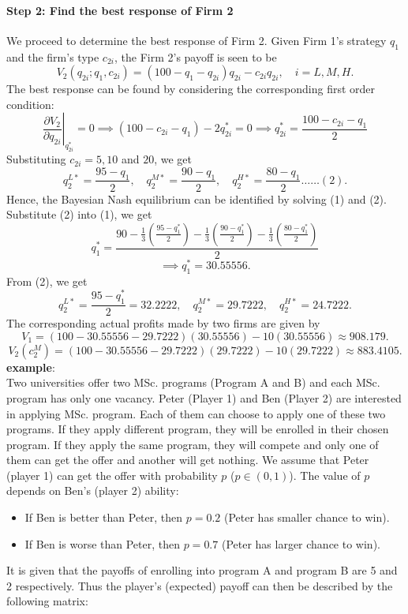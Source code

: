\documentclass[twoside]{article}
\theoremstyle{definitionstyle}
\begin{document}
\paragraph{Step 2: Find the best response of Firm 2}
We proceed to determine the best response of Firm 2. Given Firm 1's strategy $q_1$ and the firm's type $c_{2i}$, the Firm 2's payoff is seen to be 
\[
V_2(q_{2i}; q_1, c_{2i}) = (100 - q_1 - q_{2i})q_{2i} - c_{2i}q_{2i}, \quad i = L, M, H.
\]
The best response can be found by considering the corresponding first order condition:
\[
\left. \frac{\partial V_2}{\partial q_{2i}} \right|_{q_{2i}^*} = 0 \implies (100 - c_{2i} - q_1) - 2q_{2i}^* = 0 \implies q_{2i}^* = \frac{100 - c_{2i} - q_1}{2}
\]
Substituting $c_{2i} = 5, 10$ and $20$, we get 
\[
q_2^{L*} = \frac{95 - q_1}{2}, \quad q_2^{M*} = \frac{90 - q_1}{2}, \quad q_2^{H*} = \frac{80 - q_1}{2} \dots\dots (2).
\]
Hence, the Bayesian Nash equilibrium can be identified by solving (1) and (2). Substitute (2) into (1), we get 
\[
q_1^* = \frac{90 - \frac{1}{3}\left(\frac{95 - q_1^*}{2}\right) - \frac{1}{3}\left(\frac{90 - q_1^*}{2}\right) - \frac{1}{3}\left(\frac{80 - q_1^*}{2}\right)}{2}
\]
\[
\implies q_1^* = 30.55556.
\]
From (2), we get 
\[
q_2^{L*} = \frac{95 - q_1^*}{2} = 32.2222, \quad q_2^{M*} = 29.7222, \quad q_2^{H*} = 24.7222.
\]
The corresponding actual profits made by two firms are given by 
\[
V_1 = (100 - 30.55556 - 29.7222)(30.55556) - 10(30.55556) \approx 908.179.
\]
\[
V_2(c_2^M) = (100 - 30.55556 - 29.7222)(29.7222) - 10(29.7222) \approx 883.4105.
\]
%
%
%
%
%
\textbf{example}:\\
Two universities offer two MSc. programs (Program A and B) and each MSc. program has only one vacancy. Peter (Player 1) and Ben (Player 2) are interested in applying MSc. program. Each of them can choose to apply one of these two programs. If they apply different program, they will be enrolled in their chosen program. If they apply the same program, they will compete and only one of them can get the offer and another will get nothing. We assume that Peter (player 1) can get the offer with probability $p$ ($p \in (0,1)$). The value of $p$ depends on Ben's (player 2) ability:
\begin{itemize}
    \item If Ben is better than Peter, then $p = 0.2$ (Peter has smaller chance to win).
    \item If Ben is worse than Peter, then $p = 0.7$ (Peter has larger chance to win).
\end{itemize}
It is given that the payoffs of enrolling into program A and program B are 5 and 2 respectively. Thus the player's (expected) payoff can then be described by the following matrix:
\end{document}
